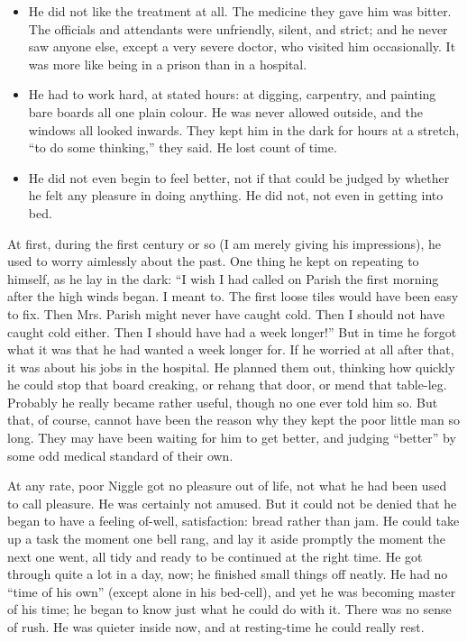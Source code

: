 \documentclass[english]{scrartcl}
\begin{document}
\begin{itemize}
\item He did not like the treatment at all. The medicine they gave him was bitter. The officials and attendants were unfriendly, silent, and strict; and he never saw anyone else, except a very severe doctor, who visited him occasionally. It was more like being in a prison than in a hospital.
\item He had to work hard, at stated hours: at digging, carpentry, and painting bare boards all one plain colour. He was never allowed outside, and the windows all looked inwards. They kept him in the dark for hours at a stretch, “to do some thinking,” they said. He lost count of time.
\item He did not even begin to feel better, not if that could be judged by whether he felt any pleasure in doing anything. He did not, not even in getting into bed.
\end{itemize}

At first, during the first century or so (I am merely giving his impressions), he used to worry aimlessly about the past. One thing he kept on repeating to himself, as he lay in the dark: “I wish I had called on Parish the first morning after the high winds began. I meant to. The first loose tiles would have been easy to fix. Then Mrs. Parish might never have caught cold. Then I should not have caught cold either. Then I should have had a week longer!” But in time he forgot what it was that he had wanted a week longer for. If he worried at all after that, it was about his jobs in the hospital. He planned them out, thinking how quickly he could stop that board creaking, or rehang that door, or mend that table-leg. Probably he really became rather useful, though no one ever told him so. But that, of course, cannot have been the reason why they kept the poor little man so long. They may have been waiting for him to get better, and judging “better” by some odd medical standard of their own.

At any rate, poor Niggle got no pleasure out of life, not what he had been used to call pleasure. He was certainly not amused. But it could not be denied that he began to have a feeling of-well, satisfaction: bread rather than jam. He could take up a task the moment one bell rang, and lay it aside promptly the moment the next one went, all tidy and ready to be continued at the right time. He got through quite a lot in a day, now; he finished small things off neatly. He had no “time of his own” (except alone in his bed-cell), and yet he was becoming master of his time; he began to know just what he could do with it. There was no sense of rush. He was quieter inside now, and at resting-time he could really rest.
\end{document}
